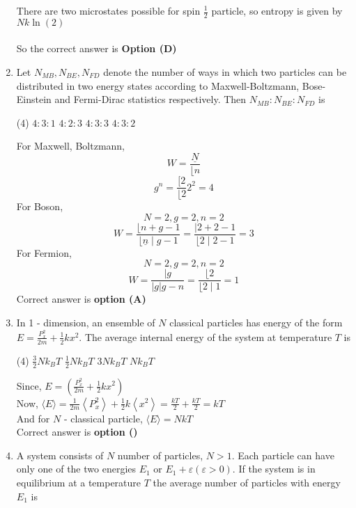 \begin{enumerate}
\begin{answer}
There are two microstates possible for spin $\frac{1}{2}$ particle, so entropy is given by $N k \ln (2)$\\\\
So the correct answer is \textbf{Option (D)}
\end{answer}
	\item Let $N_{M B}, N_{B E}, N_{F D}$ denote the number of ways in which two particles can be distributed in two energy states according to Maxwell-Boltzmann, Bose-Einstein and Fermi-Dirac statistics respectively. Then $N_{M B}: N_{B E}: N_{F D}$ is
	{}
\begin{tasks}(4)
\task[\textbf{A.}]  $4: 3: 1$
\task[\textbf{B.}]  $4: 2: 3$
\task[\textbf{C.}] $4: 3: 3$
\task[\textbf{D.}] $4: 3: 2$
\end{tasks}
\begin{answer}
For Maxwell, Boltzmann, $$W=\frac{\underline{N}}{\lfloor n}$$ $$g^{n}=\frac{[2}{\lfloor 2} 2^{2}=4$$
For Boson, $$N=2, g=2, n=2$$ 
$$ W=\frac{\lfloor n+g-1}{\lfloor\underline{n} \mid g-1}=\frac{\mid 2+2-1}{\lfloor 2 \mid 2-1}=3$$
For Fermion, $$N=2, g=2, n=2$$
$$ W=\frac{\mid g}{|g| g-n}=\frac{\lfloor 2}{\lfloor 2 \mid 1}=1$$
Correct answer is \textbf{option (A)}
\end{answer}
\item In 1 - dimension, an ensemble of $N$ classical particles has energy of the form $E=\frac{P_{x}^{2}}{2 m}+\frac{1}{2} k x^{2}$. The average internal energy of the system at temperature $T$ is 
{}
\begin{tasks}(4)
\task[\textbf{A.}] $\frac{3}{2} N k_{B} T$
\task[\textbf{B.}] $\frac{1}{2} N k_{B} T$ 
\task[\textbf{C.}] $3 N k_{B} T$
\task[\textbf{D.}] $N k_{B} T$
\end{tasks}
\begin{answer}
Since, $E=\left(\frac{P_{x}^{2}}{2 m}+\frac{1}{2} k x^{2}\right)$\\
Now, $\langle E\rangle=\frac{1}{2 m}\left\langle P_{x}^{2}\right\rangle+\frac{1}{2} k\left\langle x^{2}\right\rangle=\frac{k T}{2}+\frac{k T}{2}=k T$\\
And for $N$ - classical particle, $\langle E\rangle=N k T$\\
Correct answer is \textbf{option ()}
\end{answer}	
	\item A system consists of $N$ number of particles, $N>1 .$ Each particle can have only one of the two energies $E_{1}$ or $E_{1}+\varepsilon(\varepsilon>0) .$ If the system is in equilibrium at a temperature $T$ the average number of particles with energy $E_{1}$ is

\end{enumerate}

